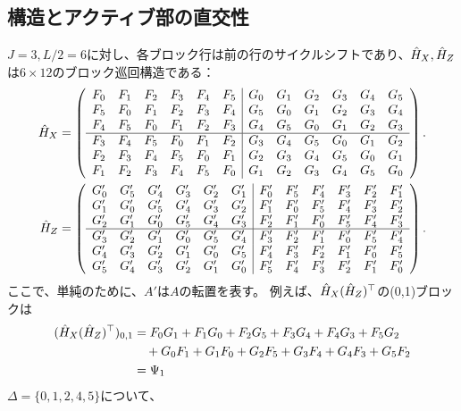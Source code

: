 \documentclass[a4paper,11pt,dvipdfmx]{jsarticle}
\theoremstyle{definition}
\begin{document}
\subsection{構造とアクティブ部の直交性}
$J=3, L/2=6$に対し、各ブロック行は前の行のサイクルシフトであり、$\hat{H}_X,\hat{H}_Z$は$6\times 12$のブロック巡回構造である：
\begin{align}
  \hat{H}_X &= \left( \begin{array}{cccccc|cccccc}
  F_0 & F_1 & F_2 & F_3 & F_4 & F_5 & G_0 & G_1 & G_2 & G_3 & G_4 & G_5 \\
  F_5 & F_0 & F_1 & F_2 & F_3 & F_4 & G_5 & G_0 & G_1 & G_2 & G_3 & G_4 \\
  F_4 & F_5 & F_0 & F_1 & F_2 & F_3 & G_4 & G_5 & G_0 & G_1 & G_2 & G_3 \\ \hline
  F_3 & F_4 & F_5 & F_0 & F_1 & F_2 & G_3 & G_4 & G_5 & G_0 & G_1 & G_2 \\
  F_2 & F_3 & F_4 & F_5 & F_0 & F_1 & G_2 & G_3 & G_4 & G_5 & G_0 & G_1 \\
  F_1 & F_2 & F_3 & F_4 & F_5 & F_0 & G_1 & G_2 & G_3 & G_4 & G_5 & G_0
  \end{array} \right).\\
  \hat{H}_Z &= \left( \begin{array}{cccccc|cccccc}
  G'_0 & G'_5 & G'_4 & G'_3 & G'_2 & G'_1 & F'_0 & F'_5 & F'_4 & F'_3 & F'_2 & F'_1 \\
  G'_1 & G'_0 & G'_5 & G'_4 & G'_3 & G'_2 & F'_1 & F'_0 & F'_5 & F'_4 & F'_3 & F'_2 \\
  G'_2 & G'_1 & G'_0 & G'_5 & G'_4 & G'_3 & F'_2 & F'_1 & F'_0 & F'_5 & F'_4 & F'_3 \\ \hline
  G'_3 & G'_2 & G'_1 & G'_0 & G'_5 & G'_4 & F'_3 & F'_2 & F'_1 & F'_0 & F'_5 & F'_4 \\
  G'_4 & G'_3 & G'_2 & G'_1 & G'_0 & G'_5 & F'_4 & F'_3 & F'_2 & F'_1 & F'_0 & F'_5 \\
  G'_5 & G'_4 & G'_3 & G'_2 & G'_1 & G'_0 & F'_5 & F'_4 & F'_3 & F'_2 & F'_1 & F'_0
  \end{array} \right).
\end{align}
ここで、単純のために、$A'$は$A$の転置を表す。
例えば、$\hat{H}_X(\hat{H}_Z)^\top$の(0,1)ブロックは
\begin{align}
  (\hat{H}_X(\hat{H}_Z)^\top)_{0,1} &= F_0G_1 + F_1G_0 + F_2G_5 + F_3G_4 + F_4G_3 + F_5G_2\\
  &\quad +G_0F_1 + G_1F_0 + G_2F_5 + G_3F_4 + G_4F_3 + G_5F_2\\
  &= \Psi_1
\end{align}
$\Delta=\{0,1,2,4,5\}$について、
\end{document}
